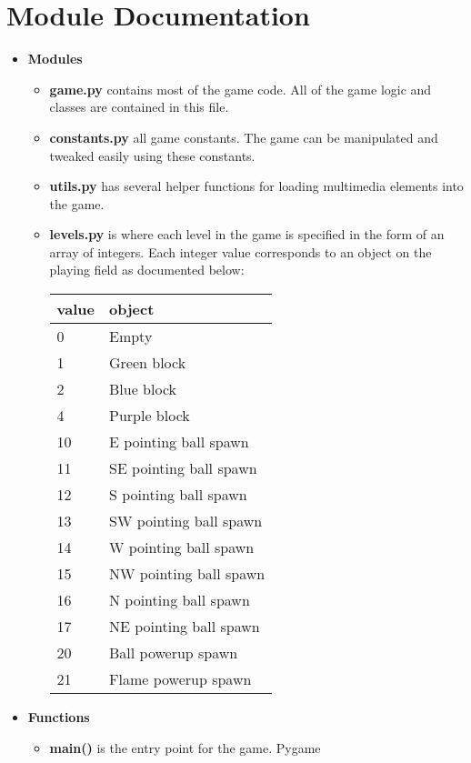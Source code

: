 \documentclass[11pt]{article}
\begin{document}
	

\section{Module Documentation}
\begin{itemize}
	\item \textbf{Modules}
	\begin{itemize}
		\item \textbf{game.py} contains most of the game code. All of the
		game logic and classes are contained in this file.
		\item \textbf{constants.py} all game constants. The game can be
		manipulated and tweaked easily using these constants.
		\item \textbf{utils.py} has several helper functions for loading
		multimedia elements into the game.
		\item \textbf{levels.py} is where each level in the game is specified
		in the form of an array of integers. Each integer value corresponds to
		an object on the playing field as documented below:\\
		\begin{tabular}{|l|l|}
		\hline
		\textbf{value} & \textbf{object}\\
		\hline
		0 & Empty\\
		1 & Green block\\
		2 & Blue block\\
		4 & Purple block\\
		10 & E pointing ball spawn\\
		11 & SE pointing ball spawn\\
		12 & S pointing ball spawn\\
		13 & SW pointing ball spawn\\
		14 & W pointing ball spawn\\
		15 & NW pointing ball spawn\\
		16 & N pointing ball spawn\\
		17 & NE pointing ball spawn	\\
		20 & Ball powerup spawn\\
		21 & Flame powerup spawn\\
		\hline
		\end{tabular}
	\end{itemize}
	\item \textbf{Functions}
	\begin{itemize}
		\item \textbf{main()} is the entry point for the game. Pygame

\end{itemize}
\end{itemize}
\end{document}
